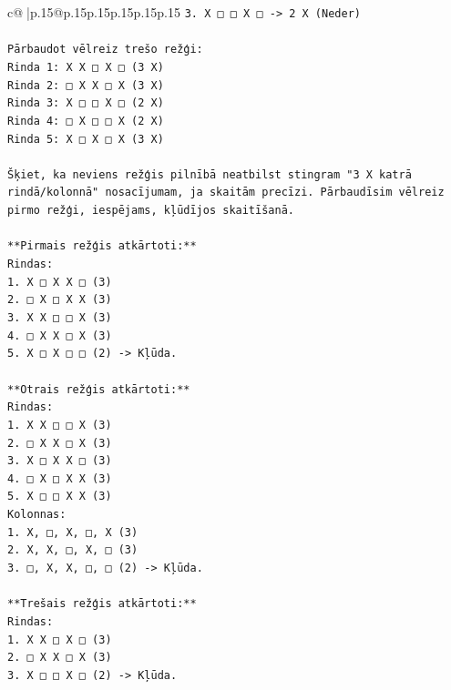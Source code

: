 \documentclass{article}
\begin{document}
{\begin{supertabular}{c@{$\;$}|p{.15\linewidth}@{}p{.15\linewidth}p{.15\linewidth}p{.15\linewidth}p{.15\linewidth}p{.15\linewidth}}
{{{\texttt{3. X □ □ X □ {-}> 2 X (Neder)} \\
\\ 
\texttt{Pārbaudot vēlreiz trešo režģi:} \\
\texttt{Rinda 1: X X □ X □ (3 X)} \\
\texttt{Rinda 2: □ X X □ X (3 X)} \\
\texttt{Rinda 3: X □ □ X □ (2 X)} \\
\texttt{Rinda 4: □ X □ □ X (2 X)} \\
\texttt{Rinda 5: X □ X □ X (3 X)} \\
\\ 
\texttt{Šķiet, ka neviens režģis pilnībā neatbilst stingram "3 X katrā rindā/kolonnā" nosacījumam, ja skaitām precīzi. Pārbaudīsim vēlreiz pirmo režģi, iespējams, kļūdījos skaitīšanā.} \\
\\ 
\texttt{**Pirmais režģis atkārtoti:**} \\
\texttt{Rindas:} \\
\texttt{1. X □ X X □ (3)} \\
\texttt{2. □ X □ X X (3)} \\
\texttt{3. X X □ □ X (3)} \\
\texttt{4. □ X X □ X (3)} \\
\texttt{5. X □ X □ □ (2) {-}> Kļūda.} \\
\\ 
\texttt{**Otrais režģis atkārtoti:**} \\
\texttt{Rindas:} \\
\texttt{1. X X □ □ X (3)} \\
\texttt{2. □ X X □ X (3)} \\
\texttt{3. X □ X X □ (3)} \\
\texttt{4. □ X □ X X (3)} \\
\texttt{5. X □ □ X X (3)} \\
\texttt{Kolonnas:} \\
\texttt{1. X, □, X, □, X (3)} \\
\texttt{2. X, X, □, X, □ (3)} \\
\texttt{3. □, X, X, □, □ (2) {-}> Kļūda.} \\
\\ 
\texttt{**Trešais režģis atkārtoti:**} \\
\texttt{Rindas:} \\
\texttt{1. X X □ X □ (3)} \\
\texttt{2. □ X X □ X (3)} \\
\texttt{3. X □ □ X □ (2) {-}> Kļūda.} \\
}}}
\end{supertabular}}
\end{document}
